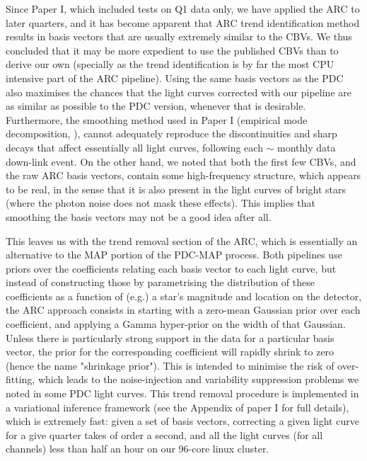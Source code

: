 \documentclass[useAMS,usenatbib]{mn2e}
\begin{document}
Since Paper I, which included tests on Q1 data only, we have applied the ARC to later quarters, and it has become apparent that ARC trend identification method results in basis vectors that are usually extremely similar to the CBVs. We thus concluded that it may be more expedient to use the published CBVs than to derive our own (specially as the trend identification is by far the most CPU intensive part of the ARC pipeline). Using the same basis vectors as the PDC also maximises the chances that the light curves corrected with our pipeline are as similar as possible to the PDC version, whenever that is desirable. 
Furthermore, the smoothing method used in Paper I (empirical mode decomposition, \citealt{hua98}), cannot adequately reproduce the discontinuities and sharp decays that affect essentially all light curves, following each $\sim$ monthly data down-link event. On the other hand, we noted that both the first few CBVs, and the raw ARC basis vectors, contain some high-frequency structure, which appears to be
real, in the sense that it is also present in the light curves of
bright stars (where the photon noise does not mask these effects). This implies that smoothing the basis vectors may not be a good idea after all.

This leaves us with the trend removal section of the ARC, which is essentially an alternative to the MAP portion of the PDC-MAP process. Both pipelines use priors over the coefficients relating each basis vector to each light curve, but instead of constructing those by parametrising the distribution of these coefficients as a function of (e.g.) a star's magnitude and location on the detector, the ARC approach consists in starting with a zero-mean Gaussian prior over each coefficient, and applying a Gamma hyper-prior on the width of that Gaussian. Unless there is particularly strong support in the data for a particular basis vector, the prior for the corresponding coefficient will rapidly shrink to zero (hence the name "shrinkage prior"). This is intended to minimise the risk of over-fitting, which leads to the noise-injection and variability suppression problems we noted in some PDC light curves. This trend removal procedure is implemented in a
variational inference framework (see the Appendix of paper I for full details), which is
extremely fast: given a set of basis vectors,
correcting a given light curve for a give quarter takes of order a second, and all the light curves (for all channels) less than half an hour on our 96-core linux cluster. 
\end{document}

